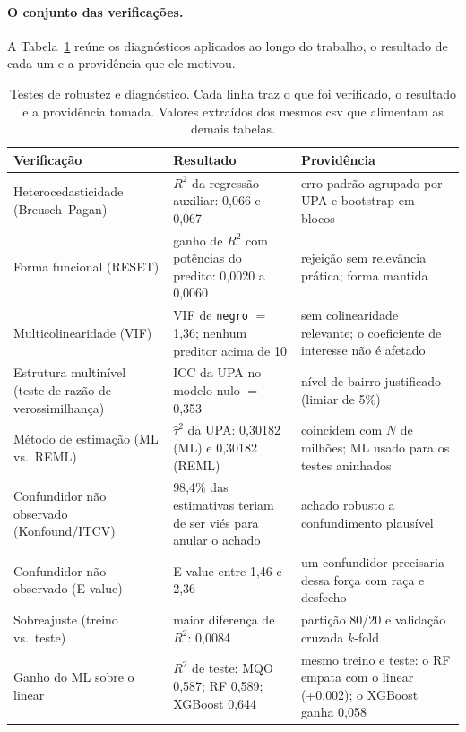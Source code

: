 \documentclass[11pt, a4paper, oneside]{article}
\begin{document}
\paragraph{O conjunto das verificações.} A Tabela~\ref{tab:robustez} reúne os diagnósticos aplicados ao longo do trabalho, o resultado de cada um e a providência que ele motivou.

\begin{table}[!ht]
\centering
\caption{Testes de robustez e diagnóstico. Cada linha traz o que foi
verificado, o resultado e a providência tomada. Valores extraídos dos
mesmos csv que alimentam as demais tabelas.}
\label{tab:robustez}
\small
\begin{tabular}{p{4.1cm}p{5.3cm}p{4.9cm}}
\toprule
Verificação & Resultado & Providência \\
\midrule
Heterocedasticidade (Breusch--Pagan) & $R^2$ da regressão auxiliar: 0{,}066 e 0{,}067 & erro-padrão agrupado por UPA e bootstrap em blocos \\
\addlinespace[2pt]
Forma funcional (RESET) & ganho de $R^2$ com potências do predito: 0{,}0020 a 0{,}0060 & rejeição sem relevância prática; forma mantida \\
\addlinespace[2pt]
Multicolinearidade (VIF) & VIF de \texttt{negro} $=$ 1{,}36; nenhum preditor acima de 10 & sem colinearidade relevante; o coeficiente de interesse não é afetado \\
\addlinespace[2pt]
Estrutura multinível (teste de razão de verossimilhança) & ICC da UPA no modelo nulo $=$ 0{,}353 & nível de bairro justificado (limiar de 5\%) \\
\addlinespace[2pt]
Método de estimação (ML vs.\ REML) & $\hat\tau^2$ da UPA: 0{,}30182 (ML) e 0{,}30182 (REML) & coincidem com $N$ de milhões; ML usado para os testes aninhados \\
\addlinespace[2pt]
Confundidor não observado (Konfound/ITCV) & 98{,}4\% das estimativas teriam de ser viés para anular o achado & achado robusto a confundimento plausível \\
\addlinespace[2pt]
Confundidor não observado (E-value) & E-value entre 1{,}46 e 2{,}36 & um confundidor precisaria dessa força com raça e desfecho \\
\addlinespace[2pt]
Sobreajuste (treino vs.\ teste) & maior diferença de $R^2$: 0{,}0084 & partição 80/20 e validação cruzada $k$-{fold} \\
\addlinespace[2pt]
Ganho do ML sobre o linear & $R^2$ de teste: MQO 0{,}587; RF 0{,}589; XGBoost 0{,}644 & mesmo treino e teste: o RF empata com o linear (+0{,}002); o XGBoost ganha 0{,}058 \\

\end{tabular}
\end{table}
\end{document}
